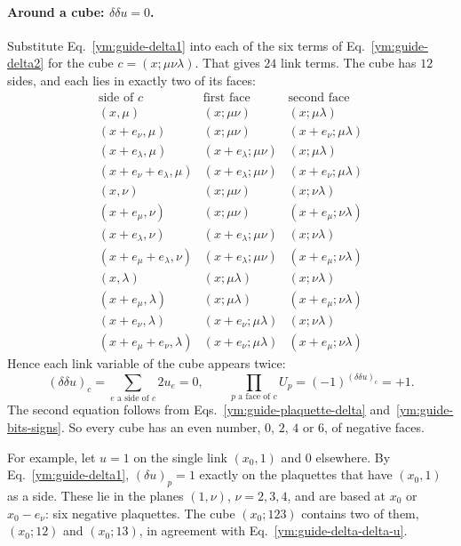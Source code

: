 \paragraph{Around a cube: $\delta\delta u=0$.}
Substitute Eq.~\eqref{ym:guide-delta1} into each of the six terms of
Eq.~\eqref{ym:guide-delta2} for the cube $c=(x;\mu\nu\lambda)$. That gives
$24$ link terms. The cube has $12$ sides, and each lies in exactly two of
its faces:
\begin{equation}\label{ym:guide-cube-sides}
\begin{array}{lll}
 \text{side of }c & \text{first face} & \text{second face}\\[2pt]
 (x,\mu) & (x;\mu\nu) & (x;\mu\lambda)\\
 (x+e_\nu,\mu) & (x;\mu\nu) & (x+e_\nu;\mu\lambda)\\
 (x+e_\lambda,\mu) & (x+e_\lambda;\mu\nu) & (x;\mu\lambda)\\
 (x+e_\nu+e_\lambda,\mu) & (x+e_\lambda;\mu\nu) & (x+e_\nu;\mu\lambda)\\
 (x,\nu) & (x;\mu\nu) & (x;\nu\lambda)\\
 (x+e_\mu,\nu) & (x;\mu\nu) & (x+e_\mu;\nu\lambda)\\
 (x+e_\lambda,\nu) & (x+e_\lambda;\mu\nu) & (x;\nu\lambda)\\
 (x+e_\mu+e_\lambda,\nu) & (x+e_\lambda;\mu\nu) & (x+e_\mu;\nu\lambda)\\
 (x,\lambda) & (x;\mu\lambda) & (x;\nu\lambda)\\
 (x+e_\mu,\lambda) & (x;\mu\lambda) & (x+e_\mu;\nu\lambda)\\
 (x+e_\nu,\lambda) & (x+e_\nu;\mu\lambda) & (x;\nu\lambda)\\
 (x+e_\mu+e_\nu,\lambda) & (x+e_\nu;\mu\lambda) & (x+e_\mu;\nu\lambda)
\end{array}
\end{equation}
Hence each link variable of the cube appears twice:
\begin{equation}\label{ym:guide-delta-delta-u}
 (\delta\delta u)_c=\sum_{e\text{ a side of }c}2u_e=0,
 \qquad
 \prod_{p\text{ a face of }c}U_p=(-1)^{(\delta\delta u)_c}=+1 .
\end{equation}
The second equation follows from Eqs.~\eqref{ym:guide-plaquette-delta}
and~\eqref{ym:guide-bits-signs}. So every cube has an even number, $0$,
$2$, $4$ or $6$, of negative faces.

For example, let $u=1$ on the single link $(x_0,1)$ and $0$ elsewhere. By
Eq.~\eqref{ym:guide-delta1}, $(\delta u)_p=1$ exactly on the plaquettes
that have $(x_0,1)$ as a side. These lie in the planes $(1,\nu)$,
$\nu=2,3,4$, and are based at $x_0$ or $x_0-e_\nu$: six negative
plaquettes. The cube $(x_0;123)$ contains two of them, $(x_0;12)$ and
$(x_0;13)$, in agreement with Eq.~\eqref{ym:guide-delta-delta-u}.

